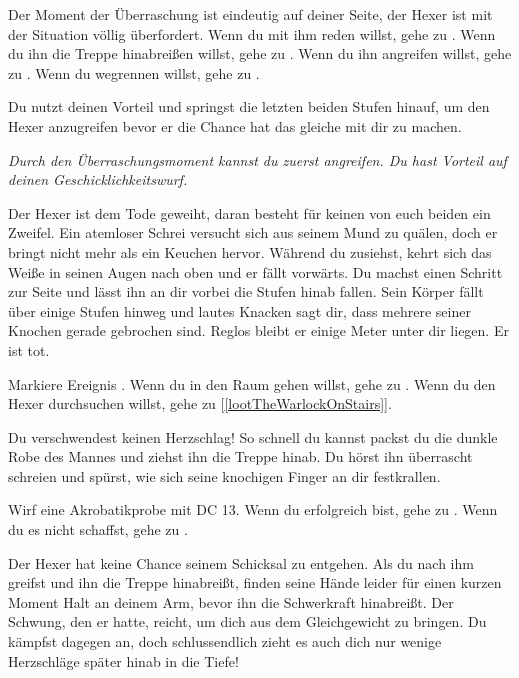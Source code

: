 Der Moment der Überraschung ist eindeutig auf deiner Seite, der Hexer ist mit der Situation völlig überfordert.
Wenn du mit ihm reden willst, gehe zu .
Wenn du ihn die Treppe hinabreißen willst, gehe zu .
Wenn du ihn angreifen willst, gehe zu .
Wenn du wegrennen willst, gehe zu .


Du nutzt deinen Vorteil und springst die letzten beiden Stufen hinauf, um den Hexer anzugreifen bevor er die Chance hat das gleiche mit dir zu machen.

\textit{Durch den Überraschungsmoment kannst du zuerst angreifen. Du hast Vorteil auf deinen Geschicklichkeitswurf.}



Der Hexer ist dem Tode geweiht, daran besteht für keinen von euch beiden ein Zweifel. Ein atemloser Schrei versucht sich aus seinem Mund zu quälen, doch er bringt nicht mehr als ein Keuchen hervor. Während du zusiehst, kehrt sich das Weiße in seinen Augen nach oben und er fällt vorwärts. Du machst einen Schritt zur Seite und lässt ihn an dir vorbei die Stufen hinab fallen.
Sein Körper fällt über einige Stufen hinweg und lautes Knacken sagt dir, dass mehrere seiner Knochen gerade gebrochen sind. Reglos bleibt er einige Meter unter dir liegen. Er ist tot.

Markiere Ereignis .
Wenn du in den Raum gehen willst, gehe zu .
Wenn du den Hexer durchsuchen willst, gehe zu [\ref{lootTheWarlockOnStairs}].


Du verschwendest keinen Herzschlag! So schnell du kannst packst du die dunkle Robe des Mannes und ziehst ihn die Treppe hinab. Du hörst ihn überrascht schreien und spürst, wie sich seine knochigen Finger an dir festkrallen.

Wirf eine Akrobatikprobe mit DC 13. Wenn du erfolgreich bist, gehe zu .
Wenn du es nicht schaffst, gehe zu .


Der Hexer hat keine Chance seinem Schicksal zu entgehen. Als du nach ihm greifst und ihn die Treppe hinabreißt, finden seine Hände leider für einen kurzen Moment Halt an deinem Arm, bevor ihn die Schwerkraft hinabreißt. Der Schwung, den er hatte, reicht, um dich aus dem Gleichgewicht zu bringen. Du kämpfst dagegen an, doch schlussendlich zieht es auch dich nur wenige Herzschläge später hinab in die Tiefe!

